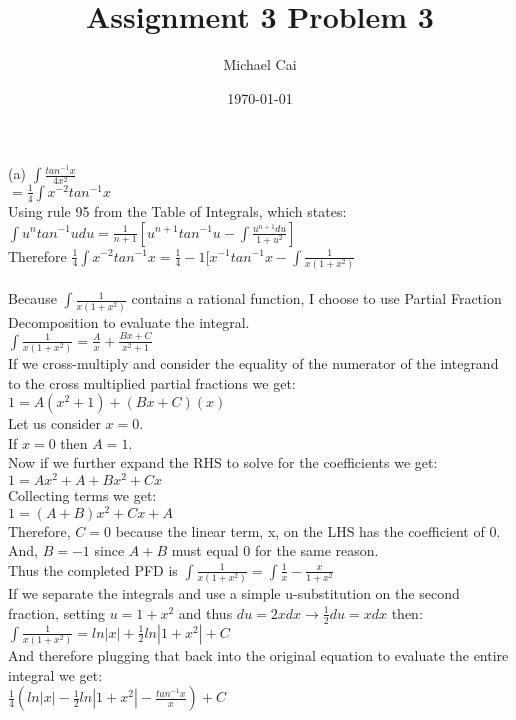 \documentclass[11pt, oneside]{article}   	%
\title{Assignment 3 Problem 3}
\author{Michael Cai}
\date{\today}							%
\begin{document}
\maketitle
\noindent (a) $\int \frac{tan^{-1}x}{4x^2}$\\
$= \frac{1}{4} \int x^{-2} tan^{-1}x$\\
Using rule 95 from the Table of Integrals, which states:\\
$\int u^n tan^{-1} u du = \frac{1}{n+1}[u^{n+1}tan^{-1}u - \int \frac{u^{n+1}du}{1+u^2}]$\\
Therefore $\frac{1}{4} \int x^{-2} tan^{-1}x = \frac{1}{4} -1[x^{-1}tan^{-1}x - \int \frac{1}{x(1+x^2)}$\\~\\
Because $\int \frac{1}{x(1+x^2)}$ contains a rational function, I choose to use Partial Fraction Decomposition to evaluate the integral.\\
$\int \frac{1}{x(1+x^2)} = \frac{A}{x} + \frac{Bx+C}{x^2+1}$\\
If we cross-multiply and consider the equality of the numerator of the integrand to the cross multiplied partial fractions we get:\\
$1 = A(x^2+1) + (Bx+C)(x)$\\
Let us consider $x = 0$.\\
If $x = 0$ then $A = 1$.\\
Now if we further expand the RHS to solve for the coefficients we get:\\
$1 = Ax^2 + A + Bx^2 + Cx$\\
Collecting terms we get:\\
$1 = (A+B)x^2 + Cx + A$\\
Therefore, $C = 0$ because the linear term, x, on the LHS has the coefficient of 0.\\
And, $B = -1$ since $A+B$ must equal 0 for the same reason.\\
Thus the completed PFD is $\int \frac{1}{x(1+x^2)} = \int \frac{1}{x} - \frac{x}{1+x^2}$\\
If we separate the integrals and use a simple u-substitution on the second fraction, setting $u = 1+x^2$ and thus $du = 2xdx \rightarrow \frac{1}{2}du = xdx$ then:\\
$\int \frac{1}{x(1+x^2)} = ln|x| + \frac{1}{2}ln|1+x^2| + C$\\
And therefore plugging that back into the original equation to evaluate the entire integral we get:\\
$\frac{1}{4} (ln|x| - \frac{1}{2}ln|1+x^2| - \frac{tan^{-1}x}{x}) + C$\\~\\~\\
\end{document}
